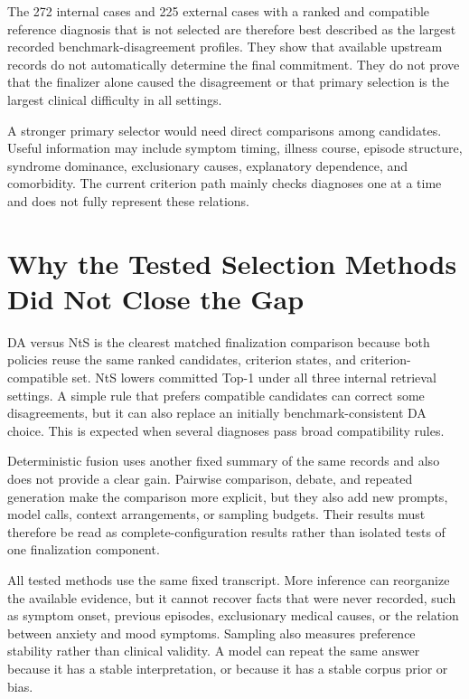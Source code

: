 The 272 internal cases and 225 external cases with a ranked and compatible reference diagnosis that is not selected are therefore best described as the largest recorded benchmark-disagreement profiles. They show that available upstream records do not automatically determine the final commitment. They do not prove that the finalizer alone caused the disagreement or that primary selection is the largest clinical difficulty in all settings.

A stronger primary selector would need direct comparisons among candidates. Useful information may include symptom timing, illness course, episode structure, syndrome dominance, exclusionary causes, explanatory dependence, and comorbidity. The current criterion path mainly checks diagnoses one at a time and does not fully represent these relations.

\section{Why the Tested Selection Methods Did Not Close the Gap}
\label{sec:discussion-selection-strategies}

DA versus NtS is the clearest matched finalization comparison because both policies reuse the same ranked candidates, criterion states, and criterion-compatible set. NtS lowers committed Top-1 under all three internal retrieval settings. A simple rule that prefers compatible candidates can correct some disagreements, but it can also replace an initially benchmark-consistent DA choice. This is expected when several diagnoses pass broad compatibility rules.

Deterministic fusion uses another fixed summary of the same records and also does not provide a clear gain. Pairwise comparison, debate, and repeated generation make the comparison more explicit, but they also add new prompts, model calls, context arrangements, or sampling budgets. Their results must therefore be read as complete-configuration results rather than isolated tests of one finalization component.

All tested methods use the same fixed transcript. More inference can reorganize the available evidence, but it cannot recover facts that were never recorded, such as symptom onset, previous episodes, exclusionary medical causes, or the relation between anxiety and mood symptoms. Sampling also measures preference stability rather than clinical validity. A model can repeat the same answer because it has a stable interpretation, or because it has a stable corpus prior or bias.

